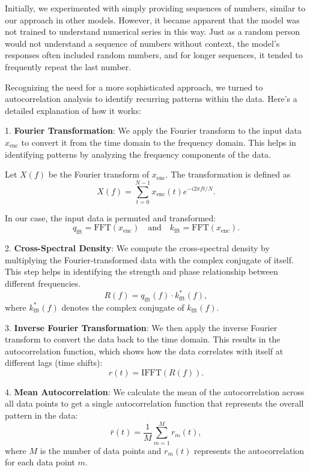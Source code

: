 Initially, we experimented with simply providing sequences of numbers, similar to our approach in other models. However, it became apparent that the model was not trained to understand numerical series in this way. Just as a random person would not understand a sequence of numbers without context, the model's responses often included random numbers, and for longer sequences, it tended to frequently repeat the last number.

Recognizing the need for a more sophisticated approach, we turned to autocorrelation analysis to identify recurring patterns within the data. Here’s a detailed explanation of how it works:

1. \textbf{Fourier Transformation}: We apply the Fourier transform to the input data \( x_{\text{enc}} \) to convert it from the time domain to the frequency domain. This helps in identifying patterns by analyzing the frequency components of the data.

Let \( X(f) \) be the Fourier transform of \( x_{\text{enc}} \). The transformation is defined as
\[
	X(f) = \sum_{t=0}^{N-1} x_{\text{enc}}(t) e^{-i 2 \pi f t / N}.
\]

In our case, the input data is permuted and transformed:
\[
	q_{\text{fft}} = \text{FFT}(x_{\text{enc}}) \quad \text{and} \quad k_{\text{fft}} = \text{FFT}(x_{\text{enc}}).
\]

2. \textbf{Cross-Spectral Density}: We compute the cross-spectral density by multiplying the Fourier-transformed data with the complex conjugate of itself. This step helps in identifying the strength and phase relationship between different frequencies.
\[
	R(f) = q_{\text{fft}}(f) \cdot k_{\text{fft}}^*(f),
\]
where \( k_{\text{fft}}^*(f) \) denotes the complex conjugate of \( k_{\text{fft}}(f) \).

3. \textbf{Inverse Fourier Transformation}: We then apply the inverse Fourier transform to convert the data back to the time domain. This results in the autocorrelation function, which shows how the data correlates with itself at different lags (time shifts):
\[
	r(t) = \text{IFFT}(R(f)).
\]

4. \textbf{Mean Autocorrelation}: We calculate the mean of the autocorrelation across all data points to get a single autocorrelation function that represents the overall pattern in the data:
\[
	\bar{r}(t) = \frac{1}{M} \sum_{m=1}^{M} r_m(t),
\]
where \( M \) is the number of data points and \( r_m(t) \) represents the autocorrelation for each data point \( m \).

